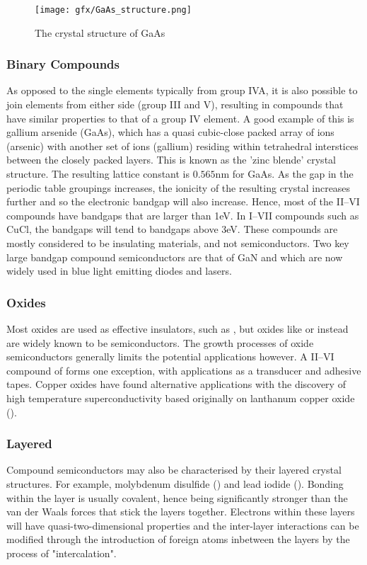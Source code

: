 \begin{figure}
    \centering
    \texttt{[image: gfx/GaAs\_structure.png]}
    \caption{The crystal structure of GaAs}
    \label{fig:GaAs_unit_cell}
\end{figure}

\subsubsection{Binary Compounds}
As opposed to the single elements typically from group IVA, it is also possible to join elements from either side (group III and V), resulting in compounds that have similar properties to that of a group IV element. A good example of this is gallium arsenide (GaAs), which has a quasi cubic-close packed array of ions (arsenic) with another set of ions (gallium) residing within tetrahedral interstices between the closely packed layers. This is known as the 'zinc blende' crystal structure. The resulting lattice constant is $0.565\si{\nano\metre}$ for GaAs. As the gap in the periodic table groupings increases, the ionicity of the resulting crystal increases further and so the electronic bandgap will also increase. Hence, most of the II--VI compounds have bandgaps that are larger than 1\si{\electronvolt}. In I--VII compounds such as CuCl, the bandgaps will tend to bandgaps above 3\si{\electronvolt}. These compounds are mostly considered to be insulating materials, and not semiconductors. Two key large bandgap compound semiconductors are that of GaN and  which are now widely used in blue light emitting diodes and lasers.

\subsubsection{Oxides}
Most oxides are used as effective insulators, such as , but oxides like  or  instead are widely known to be semiconductors. The growth processes of oxide semiconductors generally limits the potential applications however. A II--VI compound of   forms one exception, with applications as a transducer and adhesive tapes. Copper oxides have found alternative applications with the discovery of high temperature superconductivity based originally on lanthanum copper oxide ().

\subsubsection{Layered}
Compound semiconductors may also be characterised by their layered crystal structures. For example, molybdenum disulfide () and lead iodide (). Bonding within the layer is usually covalent, hence being significantly stronger than the van der Waals forces that stick the layers together. Electrons within these layers will have quasi-two-dimensional properties and the inter-layer interactions can be modified through the introduction of foreign atoms inbetween the layers by the process of "intercalation".

